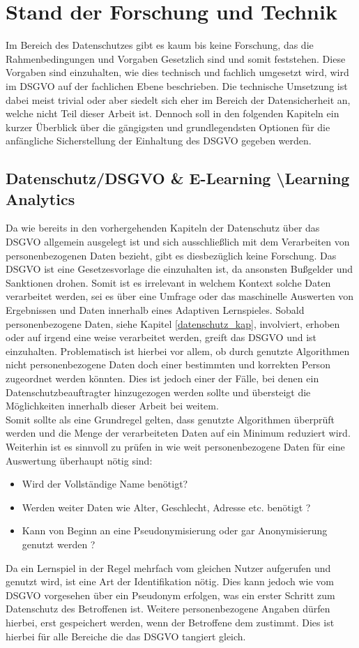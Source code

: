 \documentclass[a4paper, 12pt]{article}
\begin{document}
\section{Stand der Forschung und Technik}
Im Bereich des Datenschutzes gibt es kaum bis keine Forschung, das die Rahmenbedingungen und Vorgaben Gesetzlich sind und somit feststehen. Diese Vorgaben sind einzuhalten, wie dies technisch und fachlich umgesetzt wird, wird im DSGVO auf der fachlichen Ebene beschrieben. Die technische Umsetzung ist dabei meist trivial oder aber siedelt sich eher im Bereich der Datensicherheit an, welche nicht Teil dieser Arbeit ist. Dennoch soll in den folgenden Kapiteln ein kurzer Überblick über die gängigsten und grundlegendsten Optionen für die anfängliche Sicherstellung der Einhaltung des DSGVO gegeben werden.

\subsection{Datenschutz/DSGVO \& E-Learning \textbackslash Learning Analytics}
Da wie bereits in den vorhergehenden Kapiteln der Datenschutz über das DSGVO allgemein ausgelegt ist und sich ausschließlich mit dem Verarbeiten von personenbezogenen Daten bezieht, gibt es diesbezüglich keine Forschung. Das DSGVO ist eine Gesetzesvorlage die einzuhalten ist, da ansonsten Bußgelder und Sanktionen drohen. Somit ist es irrelevant in welchem Kontext solche Daten verarbeitet werden, sei es über eine Umfrage oder das maschinelle Auswerten von Ergebnissen und Daten innerhalb eines Adaptiven Lernspieles. Sobald personenbezogene Daten, siehe Kapitel \ref{datenschutz_kap}, involviert, erhoben oder auf irgend eine weise verarbeitet werden, greift das DSGVO und ist einzuhalten. Problematisch ist hierbei vor allem, ob durch genutzte Algorithmen nicht personenbezogene Daten doch einer bestimmten und korrekten Person zugeordnet werden könnten. Dies ist jedoch einer der Fälle, bei denen ein Datenschutzbeauftragter hinzugezogen werden sollte und übersteigt die Möglichkeiten innerhalb dieser Arbeit bei weitem.\\ Somit sollte als eine Grundregel gelten, dass genutzte Algorithmen überprüft werden und die Menge der verarbeiteten Daten auf ein Minimum reduziert wird.\\Weiterhin ist es sinnvoll zu prüfen in wie weit personenbezogene Daten für eine Auswertung überhaupt nötig sind:
\begin{itemize}
	\item Wird der Vollständige Name benötigt?
	\item Werden weiter Daten wie Alter, Geschlecht, Adresse etc. benötigt ?
	\item Kann von Beginn an eine Pseudonymisierung oder gar Anonymisierung genutzt werden ?
\end{itemize}
Da ein Lernspiel in der Regel mehrfach vom gleichen Nutzer aufgerufen und genutzt wird, ist eine Art der Identifikation nötig. Dies kann jedoch wie vom DSGVO vorgesehen über ein Pseudonym erfolgen, was ein erster Schritt zum Datenschutz des Betroffenen ist. Weitere personenbezogene Angaben dürfen hierbei, erst gespeichert werden, wenn der Betroffene dem zustimmt. Dies ist hierbei für alle Bereiche die das DSGVO tangiert gleich.
\end{document}
